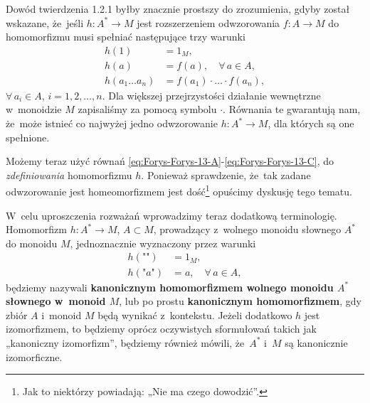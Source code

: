 \documentclass[a4paper,11pt]{article}
\begin{document}
\start {} Dowód twierdzenia 1.2.1 byłby znacznie prostszy do
zrozumienia, gdyby został wskazane, że~jeśli $h : A^{ * } \to M$ jest
rozszerzeniem odwzorowania $f : A \to M$ do homomorfizmu musi spełniać
następujące trzy warunki
\begin{subequations}
  \begin{align}
    \label{eq:Forys-Forys-13-A}
    h( 1 ) &= 1_{ M }, \\
    \label{eq:Forys-Forys-13-B}
    h( a ) &= f( a ), \quad \forall \, a \in A, \\
    \label{eq:Forys-Forys-13-C}
    h( a_{ 1 } \ldots a_{ n } )
           &= f( a_{ 1 } ) \cdot \ldots \cdot f( a_{ n } ),
  \end{align}
\end{subequations}
$\forall \, a_{ i } \in A$, $i = 1, 2, \ldots, n$. Dla większej przejrzystości działanie
wewnętrzne w~monoidzie $M$ zapisaliśmy za pomocą symbolu $\cdot$. Równania te
gwarantują nam, że~może istnieć co najwyżej jedno odwzorowanie
$h : A^{ * } \to M$, dla których są one spełnione.

Możemy teraz użyć równań
\eqref{eq:Forys-Forys-13-A}-\eqref{eq:Forys-Forys-13-C}, do
\textit{zdefiniowania} homomorfizmu $h$. Ponieważ sprawdzenie, że~tak zadane
odwzorowanie jest homeomorfizmem jest dość\footnote{Jak to niektórzy
  powiadają: „Nie ma czego dowodzić”.} opuścimy dyskusję tego tematu.

\vspace{\spaceFour}





\start {} W~celu uproszczenia rozważań wprowadzimy teraz dodatkową
terminologię. Homomorfizm $h : A^{ * } \to M$, $A \subset M$, prowadzący z~wolnego
monoidu słownego $A^{ * }$ do monoidu $M$, jednoznacznie wyznaczony przez
warunki
\begin{subequations}
  \begin{align}
    \label{eq:Forys-Forys-14-A}
    h( \texttt{""} ) &= 1_{ M }, \\
    \label{eq:Forys-Forys-14-B}
    h( \texttt{"} a \texttt{"} ) &= a, \quad
                                   \forall \, a \in A,
  \end{align}
\end{subequations}
będziemy nazywali \textbf{kanonicznym homomorfizmem wolnego monoidu $A^{ * }$
  słownego w~monoid $M$}, lub po prostu \textbf{kanonicznym
  homomorfizmem}, gdy zbiór $A$ i~monoid $M$ będą wynikać z~kontekstu.
Jeżeli dodatkowo $h$ jest izomorfizmem, to będziemy oprócz oczywistych
sformułowań takich jak „kanoniczny izomorfizm”, będziemy również mówili,
że~$A^{ * }$ i~$M$ są kanonicznie izomorficzne.
\end{document}

